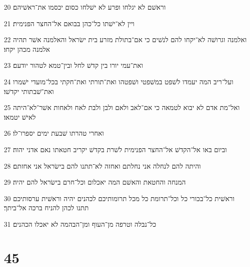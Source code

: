 \par 20 וראשׁם לא יגלחו ופרע לא ישׁלחו כסום יכסמו את־ראשׁיהם׃
\par 21 ויין לא־ישׁתו כל־כהן בבואם אל־החצר הפנימית׃
\par 22 ואלמנה וגרושׁה לא־יקחו להם לנשׁים כי אם־בתולת מזרע בית ישׂראל והאלמנה אשׁר תהיה אלמנה מכהן יקחו׃
\par 23 ואת־עמי יורו בין קדשׁ לחל ובין־טמא לטהור יודעם׃
\par 24 ועל־ריב המה יעמדו לשׁפט במשׁפטי ושׁפטהו ואת־תורתי ואת־חקתי בכל־מועדי ישׁמרו ואת־שׁבתותי יקדשׁו׃
\par 25 ואל־מת אדם לא יבוא לטמאה כי אם־לאב ולאם ולבן ולבת לאח ולאחות אשׁר־לא־היתה לאישׁ יטמאו׃
\par 26 ואחרי טהרתו שׁבעת ימים יספרו־לו׃
\par 27 וביום באו אל־הקדשׁ אל־החצר הפנימית לשׁרת בקדשׁ יקריב חטאתו נאם אדני יהוה׃
\par 28 והיתה להם לנחלה אני נחלתם ואחזה לא־תתנו להם בישׂראל אני אחזתם׃
\par 29 המנחה והחטאת והאשׁם המה יאכלום וכל־חרם בישׂראל להם יהיה׃
\par 30 וראשׁית כל־בכורי כל וכל־תרומת כל מכל תרומותיכם לכהנים יהיה וראשׁית ערסותיכם תתנו לכהן להניח ברכה אל־ביתך׃
\par 31 כל־נבלה וטרפה מן־העוף ומן־הבהמה לא יאכלו הכהנים׃

\chapter{45}

